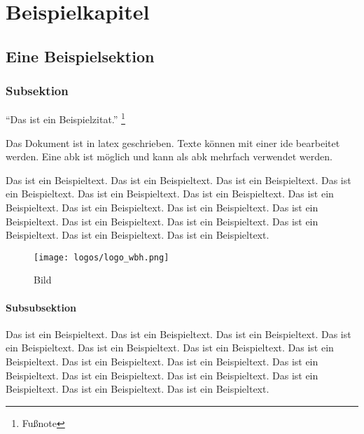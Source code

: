 \chapter{Beispielkapitel}
\label{ch:01-example}

\begin{comment}
Dies ist ein mehrzeiliger Kommentar.
Er wird nicht im Dokument angezeigt.
\end{comment}

\section{Eine Beispielsektion}
\label{sec:01-00-example}

\subsection{Subsektion}
\label{subsec:01-00-00-subsection}

\enquote{Das ist ein Beispielzitat.} \footnote{Fußnote}

Das Dokument ist in \Gls{latex} geschrieben.
Texte können mit einer \gls{ide} bearbeitet werden.
Eine \gls{abk} ist möglich und kann als \gls{abk} mehrfach verwendet werden.

Das ist ein Beispieltext. Das ist ein Beispieltext. Das ist ein Beispieltext. Das ist ein Beispieltext. Das ist ein Beispieltext. Das ist ein Beispieltext. Das ist ein Beispieltext. Das ist ein Beispieltext. Das ist ein Beispieltext. Das ist ein Beispieltext. Das ist ein Beispieltext. Das ist ein Beispieltext. Das ist ein Beispieltext. Das ist ein Beispieltext. Das ist ein Beispieltext.

\begin{figure}
	\centering
	\texttt{[image: logos/logo\_wbh.png]}
	\caption{Bild}
\end{figure}

\subsubsection{Subsubsektion}
\label{subsubsec:01-00-00-00-subsubsection}

Das ist ein Beispieltext. Das ist ein Beispieltext. Das ist ein Beispieltext. Das ist ein Beispieltext. Das ist ein Beispieltext. Das ist ein Beispieltext. Das ist ein Beispieltext. Das ist ein Beispieltext. Das ist ein Beispieltext. Das ist ein Beispieltext. Das ist ein Beispieltext. Das ist ein Beispieltext. Das ist ein Beispieltext. Das ist ein Beispieltext. Das ist ein Beispieltext.

